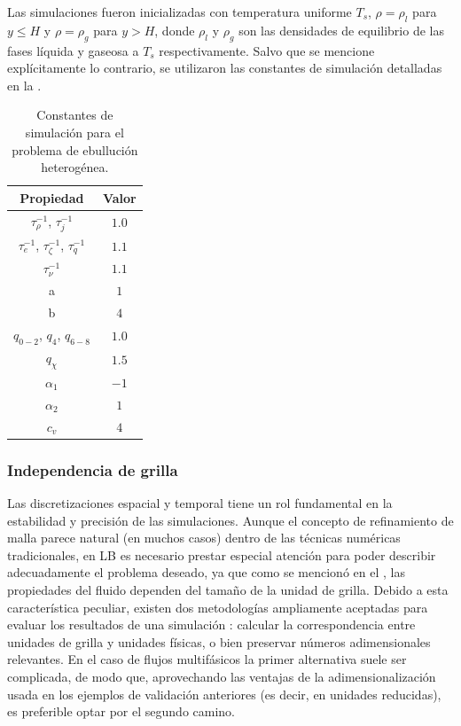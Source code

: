 Las simulaciones fueron inicializadas con temperatura uniforme $T_s$, $\rho = \rho_l$ para $y\leq H$ y $\rho = \rho_g$ para $y > H$, donde $\rho_l$ y $\rho_g$ son las densidades de equilibrio de las fases l\'iquida y gaseosa a $T_s$ respectivamente. Salvo que se mencione expl\'icitamente lo contrario, se utilizaron las constantes de simulaci\'on detalladas en la .

\begin{table}[ht]
	\centering
    \begin{tabular}{c c}
	    \toprule
        \bf Propiedad & \bf Valor \\
        \midrule
        $\tau_{\rho}^{-1}$, $\tau_{j}^{-1}$ & $1.0$\\
        $\tau_{e}^{-1}$, $\tau_{\zeta}^{-1}$, $\tau_{q}^{-1}$ & $1.1$ \\
        $\tau_{\nu}^{-1}$ & $1.1$ \\
		a & $1$ \\
		b & $4$ \\
		$q_{0-2}$, $q_4$, $q_{6-8}$ & $1.0$ \\
		$q_{\chi}$ & $1.5$ \\
		$\alpha_1$ & $-1$ \\
		$\alpha_2$ & $1$ \\
		$c_v$ & $4$ \\
        \bottomrule
	\end{tabular}
	\caption{Constantes de simulaci\'on para el problema de ebulluci\'on heterog\'enea.}
	\label{tab:hetb_prop}
\end{table}  
\FloatBarrier


\subsubsection{Independencia de grilla}

Las discretizaciones espacial y temporal tiene un rol fundamental en la estabilidad y precisi\'on de las simulaciones. Aunque el concepto de refinamiento de malla parece natural (en muchos casos) dentro de las t\'ecnicas num\'ericas tradicionales, en LB es necesario prestar especial atenci\'on para poder describir adecuadamente el problema deseado, ya que como se mencion\'o en el , las propiedades del fluido dependen del tama\~no de la unidad de grilla. Debido a esta caracter\'istica peculiar, existen dos metodolog\'ias ampliamente aceptadas para evaluar los resultados de una simulaci\'on \cite{kruger_lattice_2017}: calcular la correspondencia entre unidades de grilla y unidades f\'isicas, o bien preservar n\'umeros adimensionales relevantes. En el caso de flujos multif\'asicos la primer alternativa suele ser complicada, de modo que, aprovechando las ventajas de la adimensionalizaci\'on usada en los ejemplos de validaci\'on anteriores (es decir, en unidades reducidas), es preferible optar por el segundo camino.

